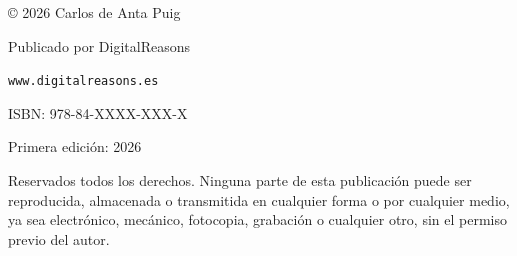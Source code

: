 \thispagestyle{empty}

\vspace*{6cm}

\begin{center}

{\small
© 2026 Carlos de Anta Puig}

\vspace{0.5cm}

{\small
Publicado por DigitalReasons}

\vspace{0.5cm}

{\small
\texttt{www.digitalreasons.es}}

\vspace{1cm}

{\small
ISBN: 978-84-XXXX-XXX-X}

\vspace{0.5cm}

{\small
Primera edición: 2026}

\vspace{0.5cm}

{\small
Reservados todos los derechos. Ninguna parte de esta publicación puede ser reproducida, almacenada o transmitida en cualquier forma o por cualquier medio, ya sea electrónico, mecánico, fotocopia, grabación o cualquier otro, sin el permiso previo del autor.}

\end{center}

\clearpage